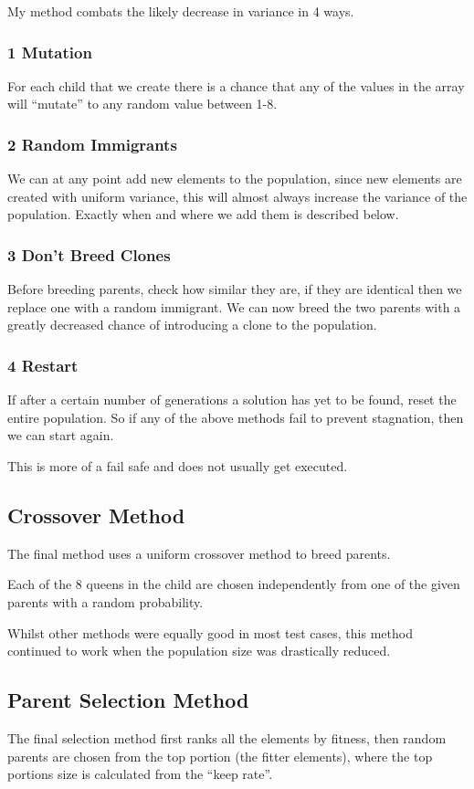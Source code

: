 \documentclass[a4paper,11pt]{article}
\begin{document}
My method combats the likely decrease in variance in 4 ways.
\subsubsection*{1 Mutation}
For each child that we create there is a chance that any of the values in the array will ``mutate'' to any random value between 1-8.
\subsubsection*{2 Random Immigrants}
We can at any point add new elements to the population, since new elements are created with uniform variance, this will almost always increase the variance of the population.
Exactly when and where we add them is described below.
\subsubsection*{3 Don't Breed Clones}
Before breeding parents, check how similar they are, if they are identical then we replace one with a random immigrant. We can now breed the two parents with a greatly decreased chance of introducing a clone to the population.
\subsubsection*{4 Restart}
If after a certain number of generations a solution has yet to be found, reset the entire population. So if any of the above methods fail to prevent stagnation, then we can start again.

This is more of a fail safe and does not usually get executed.

\subsection*{Crossover Method}
The final method uses a uniform crossover method to breed parents.

Each of the 8 queens in the child are chosen independently from one of the given parents with a random probability.

Whilst other methods were equally good in most test cases, this method continued to work when the population size was drastically reduced.
\subsection*{Parent Selection Method}
The final selection method first ranks all the elements by fitness, then random parents are chosen from the top portion (the fitter elements), where the top portions size is calculated from the ``keep rate''.
\end{document}

